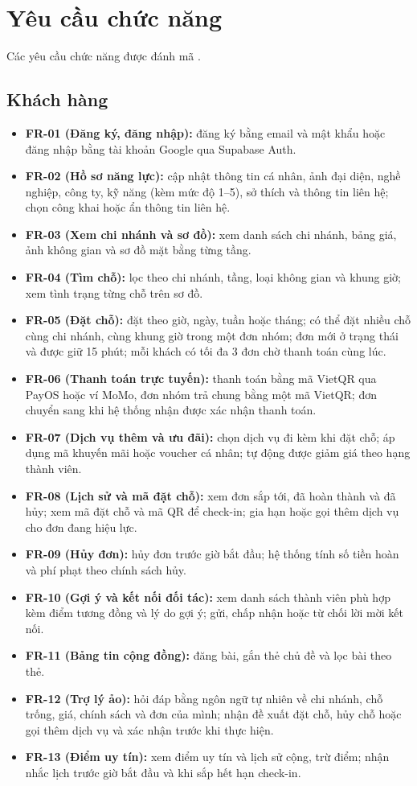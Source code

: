 \section{Yêu cầu chức năng}
\label{sec:yeucau_chucnang}

Các yêu cầu chức năng được đánh mã .

\subsection{Khách hàng}
\begin{itemize}
    \item \textbf{FR-01 (Đăng ký, đăng nhập):} đăng ký bằng email và mật khẩu hoặc đăng nhập bằng tài khoản Google qua Supabase Auth.
    \item \textbf{FR-02 (Hồ sơ năng lực):} cập nhật thông tin cá nhân, ảnh đại diện, nghề nghiệp, công ty, kỹ năng (kèm mức độ 1--5), sở thích và thông tin liên hệ; chọn công khai hoặc ẩn thông tin liên hệ.
    \item \textbf{FR-03 (Xem chi nhánh và sơ đồ):} xem danh sách chi nhánh, bảng giá, ảnh không gian và sơ đồ mặt bằng từng tầng.
    \item \textbf{FR-04 (Tìm chỗ):} lọc theo chi nhánh, tầng, loại không gian và khung giờ; xem tình trạng từng chỗ trên sơ đồ.
    \item \textbf{FR-05 (Đặt chỗ):} đặt theo giờ, ngày, tuần hoặc tháng; có thể đặt nhiều chỗ cùng chi nhánh, cùng khung giờ trong một đơn nhóm; đơn mới ở trạng thái  và được giữ 15 phút; mỗi khách có tối đa 3 đơn chờ thanh toán cùng lúc.
    \item \textbf{FR-06 (Thanh toán trực tuyến):} thanh toán bằng mã VietQR qua PayOS hoặc ví MoMo, đơn nhóm trả chung bằng một mã VietQR; đơn chuyển sang  khi hệ thống nhận được xác nhận thanh toán.
    \item \textbf{FR-07 (Dịch vụ thêm và ưu đãi):} chọn dịch vụ đi kèm khi đặt chỗ; áp dụng mã khuyến mãi hoặc voucher cá nhân; tự động được giảm giá theo hạng thành viên.
    \item \textbf{FR-08 (Lịch sử và mã đặt chỗ):} xem đơn sắp tới, đã hoàn thành và đã hủy; xem mã đặt chỗ và mã QR để check-in; gia hạn hoặc gọi thêm dịch vụ cho đơn đang hiệu lực.
    \item \textbf{FR-09 (Hủy đơn):} hủy đơn trước giờ bắt đầu; hệ thống tính số tiền hoàn và phí phạt theo chính sách hủy.
    \item \textbf{FR-10 (Gợi ý và kết nối đối tác):} xem danh sách thành viên phù hợp kèm điểm tương đồng và lý do gợi ý; gửi, chấp nhận hoặc từ chối lời mời kết nối.
    \item \textbf{FR-11 (Bảng tin cộng đồng):} đăng bài, gắn thẻ chủ đề và lọc bài theo thẻ.
    \item \textbf{FR-12 (Trợ lý ảo):} hỏi đáp bằng ngôn ngữ tự nhiên về chi nhánh, chỗ trống, giá, chính sách và đơn của mình; nhận đề xuất đặt chỗ, hủy chỗ hoặc gọi thêm dịch vụ và xác nhận trước khi thực hiện.
    \item \textbf{FR-13 (Điểm uy tín):} xem điểm uy tín và lịch sử cộng, trừ điểm; nhận nhắc lịch trước giờ bắt đầu và khi sắp hết hạn check-in.
\end{itemize}

